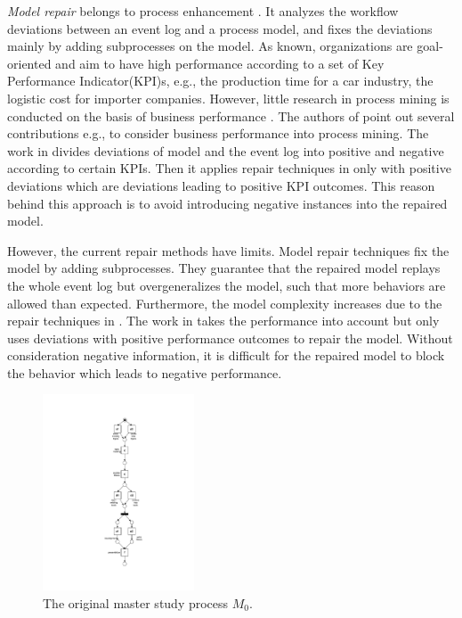 \emph{Model repair} belongs to process enhancement \cite{fahland2012repairing}. It analyzes the workflow deviations between an event log and a process model, and fixes the deviations mainly by adding subprocesses on the model. As known, organizations are goal-oriented and aim to have high performance according to a set of Key Performance Indicator(KPI)s, e.g., the production time for a car industry, the logistic cost for importer companies.  However, little research in process mining is conducted on the basis of business performance \cite{ghasemi2019event}.  The authors of  \cite{ghasemi2019event} point out several contributions e.g.,   \cite{dees2017enhancing} to consider business performance into process mining. The work in  \cite{dees2017enhancing} divides deviations of model and the event log into positive and negative according to certain KPIs. Then it applies repair techniques in  \cite{fahland2012repairing} only with positive deviations which are deviations leading to positive KPI outcomes. This reason behind this approach  is to avoid introducing negative instances into the repaired model. 

However, the current repair methods have limits. Model repair techniques fix the model by adding subprocesses. They guarantee that the repaired model replays the whole event log but overgeneralizes the model, such that more behaviors are allowed than expected. Furthermore, the model complexity increases due to the repair techniques in \cite{fahland2012repairing}.  The work in \cite{dees2017enhancing} takes the performance into account but only uses deviations with positive performance outcomes to repair the model. Without consideration negative information, it is difficult for the repaired model to block the behavior which leads to negative performance.
 
\begin{figure}
	\centering
	\includegraphics[clip, trim=8.5cm 3cm 7cm 3cm, width=0.4\textwidth, height=0.6\textheight]{figures/introduction/thesis-demo-final-original-model.pdf}
	\caption{The original master study process $M_0$.}
	\label{fig:demo-M0}
\end{figure} 

